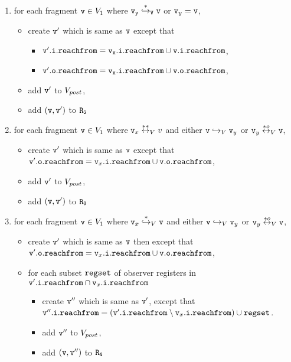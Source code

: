 \begin{enumerate}
\item for each fragment $\mathtt{v} \in V_1$ where $\tt \mathtt{v}_y \overset{*}\hookrightarrow_{V} \mathtt{v}$ or $\mathtt{v}_y = \mathtt{v}$, 
\begin{itemize}
	\item create  $\mathtt{v}'$ which is same as $\mathtt{v}$ except that
\begin{itemize}
 \item $\tt \mathtt{v}'.\mathtt{i}.\mathtt{reachfrom} = \mathtt{v}_x.\mathtt{i}.\mathtt{reachfrom} \cup \tt \mathtt{v}.\mathtt{i}.\mathtt{reachfrom}$, 
\item $\tt \mathtt{v}'.\mathtt{o}.\mathtt{reachfrom} = \mathtt{v}_x.\mathtt{i}.\mathtt{reachfrom} \cup \tt \mathtt{v}.\mathtt{o}.\mathtt{reachfrom}$, 
\end{itemize}
\item add $\mathtt{v}'$ to $V_{post}$,
\item add $(\mathtt{v},\mathtt{v}')$ to $\tt R_2$
\end{itemize}
\item for each fragment $\mathtt{v} \in V_1$ where $\mathtt{v}_x \overset{**}\leftrightarrow_{V} v$ and either $\mathtt{v} \hookrightarrow_{V} \mathtt{v}_y$ or $\mathtt{v}_y \overset{*o}\leftrightarrow_{V} \mathtt{v}$, 
\begin{itemize}
\item  create $\mathtt{v}'$ which is same as $\mathtt{v}$ except that $\mathtt{v}'.\mathtt{o}.\mathtt{reachfrom} = \mathtt{v}_x.\mathtt{i}.\mathtt{reachfrom} \cup \mathtt{v}.\mathtt{o}.\mathtt{reachfrom}$, 
 \item add $\mathtt{v}'$ to $V_{post}$, 
 \item add $(\mathtt{v},\mathtt{v}')$ to $\tt R_3$

\end{itemize}


\item for each fragment $\mathtt{v} \in V_1$ where $\mathtt{v}_x \overset{*}\hookrightarrow_{V} \mathtt{v}$ and either $\mathtt{v} \hookrightarrow_{V} \mathtt{v}_y$ or $\mathtt{v}_y \overset{*o}\leftrightarrow_{V} \mathtt{v}$,  
\begin{itemize}
\item create $\mathtt{v}'$ which is same as $\mathtt{v}$ then except that $ \mathtt{v}'.\mathtt{o}.\mathtt{reachfrom} = \mathtt{v}_x.\mathtt{i}.\mathtt{reachfrom} \cup \mathtt{v}.\mathtt{o}.\mathtt{reachfrom}$, 
\item for each subset $\mathtt{regset}$ of observer registers in $\mathtt{v}'.\mathtt{i}.\mathtt{reachfrom} \cap \mathtt{v}_x.\mathtt{i}.\mathtt{reachfrom}$
\begin{itemize}
\item create $\mathtt{v}''$ which is same as $\mathtt{v}'$, except that $\mathtt{v}''.\mathtt{i}.\mathtt{reachfrom} = (\mathtt{v}'.\mathtt{i}.\mathtt{reachfrom} \setminus \mathtt{v}_x.\mathtt{i}.\mathtt{reachfrom}) \cup \mathtt{regset}$.
\item add $\mathtt{v}''$ to $V_{post}$,
\item add $(\mathtt{v},\mathtt{v}'')$ to $\tt R_4$
\end{itemize}
\end{itemize}


\end{enumerate}
